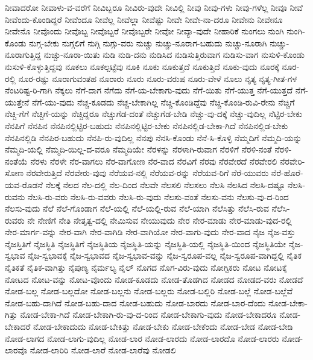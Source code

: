 {ನೀವಾದರೋ
ನೀವಾಳು-ವ-ವರೆಗೆ
ನೀವಿಬ್ಬರೂ
ನೀವಿರು-ವುದೇ
ನೀವಿಲ್ಲಿ
ನೀವು
ನೀವು-ಗಳು
ನೀವು-ಗಳೆಲ್ಲ
ನೀವೂ
ನೀವೆ
ನೀವೆಂದು-ಕೊಂಡಿದ್ದರೆ
ನೀವೆಂದೂ
ನೀವೆಲ್ಲ
ನೀವೆಲ್ಲಾ
ನೀವೆಷ್ಟು
ನೀವೇ
ನೀವೇ-ನಾ-ದರೂ
ನೀವೇನು
ನೀವೇನೂ
ನೀವೇನೊ
ನೀವೊಂದು
ನೀವೊಬ್ಬ
ನೀವೊಬ್ಬರೆ
ನೀವೊಬ್ಬರೇ
ನೀವೋ
ನೀವ್ಯಾ-ವುದೇ
ನೀಹಾರಿಕೆ
ನುಂಗಲು
ನುಂಗಿ
ನುಂಗಿ-ಕೊಂಡು
ನುಗ್ಗ-ಬೇಕು
ನುಗ್ಗಲಿಗೆ
ನುಗ್ಗಿ
ನುಗ್ಗು-ವರು
ನುಚ್ಚು
ನುಚ್ಚು-ನೂರಾಗ-ಬಹುದು
ನುಚ್ಚು-ನೂರಾಗಿ
ನುಚ್ಚು-ನೂರಾಗುತ್ತಿದ್ದ
ನುಚ್ಚು-ನೂರಾ-ಯಿತು
ನುಡಿ
ನುಡಿ-ದನು
ನುಡಿಸಿದ
ನುಡಿಸುತ್ತಿರುವಾಗ
ನುಡಿಸು-ವಾಗ
ನುಸುಳಿ-ಕೊಂಡು
ನುಸುಳಿ-ಕೊಳ್ಳುತ್ತಿದ್ದವು
ನೂಕಲು
ನೂಕಲ್ಪಟ್ಟೆವು
ನೂಕಿ
ನೂಕು
ನೂಕುತ್ತದೆ
ನೂಕುತ್ತಿದೆ
ನೂಕು-ವುದು
ನೂರಕ್ಕೆ
ನೂರ-ರಲ್ಲಿ
ನೂರ-ರಷ್ಟು
ನೂರಾಗುವಂತಹ
ನೂರಾರು
ನೂರು
ನೂರು-ವರುಷ
ನೂರು-ವೇಳೆ
ನೂಲು
ನೃತ್ಯ
ನೃತ್ಯ-ಗೀತ-ಗಳ
ನೆಂಟರಿಷ್ಟ-ರಿ-ಗಾಗಿ
ನೆಕ್ಕಲು
ನೆಗೆ-ದಾಗ
ನೆಗೆದು
ನೆಗೆ-ಯ-ಬೇಕಾಗು-ವುದು
ನೆಗೆ-ಯಿತು
ನೆಗೆ-ಯುತ್ತ
ನೆಗೆ-ಯುತ್ತದೆ
ನೆಗೆ-ಯುತ್ತೇನೆ
ನೆಗೆ-ಯು-ವುದು
ನೆಚ್ಚ-ಕೂಡದು
ನೆಚ್ಚ-ಬೇಕಾಗಿಲ್ಲ
ನೆಚ್ಚಿ-ಕೊಂಡಿದ್ದೆವು
ನೆಚ್ಚಿ-ಕೊಂಡಿ-ರುವಿ-ರೇನು
ನೆಚ್ಚಿಗೆ
ನೆಚ್ಚಿ-ಗೆಗೆ
ನೆಚ್ಚಿಗೆ-ಯನ್ನು
ನೆಚ್ಚಿದ್ದರೂ
ನೆಚ್ಚುಗೆಡ-ದಂತೆ
ನೆಚ್ಚುಗೆಡ-ಬೇಡಿ
ನೆಚ್ಚು-ವು-ದಕ್ಕೆ
ನೆಚ್ಚು-ವುದಿಲ್ಲ
ನೆಟ್ಟಿರ-ಬೇಕು
ನೆನಪಿಗೆ
ನೆನಪಿನ
ನೆನಪಿನಲ್ಲಿಟ್ಟಿರ-ಬಹುದು
ನೆನಪಿನಲ್ಲಿಟ್ಟಿರ-ಬೇಕು
ನೆನಪಿನಲ್ಲಿಡ-ಬೇಕಾ-ಗಿದೆ
ನೆನಪಿನಲ್ಲಿಡ-ಬೇಕು
ನೆನಪಿನಲ್ಲಿಡಿ
ನೆನಪಿರ-ಬಹುದು
ನೆನಪಿ-ರು-ವುದಿಲ್ಲ
ನೆನಪು
ನೆನಸಿ-ಕೊಂಡು
ನೆನೆ-ಸಿ-ಕೊಳ್ಳಿ
ನೆಮ್ಮದಿಗೆ
ನೆಮ್ಮದಿ-ಯನ್ನು
ನೆಮ್ಮದಿ-ಯಲ್ಲಿ
ನೆಮ್ಮದಿ-ಯಿಲ್ಲ-ದ-ವರೂ
ನೆಮ್ಮದಿಯೇ
ನೆರಳನ್ನು
ನೆರಳಾಗಿ-ರುವಾಗ
ನೆರಳಿಗೆ
ನೆರಳಿ-ನಂತೆ
ನೆರಳಿ-ನಂತೆಯೆ
ನೆರಳು
ನೆರಳೇ
ನೆರ-ವಾಗಲು
ನೆರ-ವಾಗೋಣ
ನೆರ-ವಾದ
ನೆರವಿಗೆ
ನೆರವು
ನೆರವೇರದೆ
ನೆರವೇರಲಿ
ನೆರವೇರಿ-ಸೋಣ
ನೆರವೇರುತ್ತಿದೆ
ನೆರವೇರು-ವುವು
ನೆರೆಯವ-ನಲ್ಲಿ
ನೆರೆಯವ-ರನ್ನು
ನೆರೆಯವ-ರಿಗೆ
ನೆರೆ-ಯುವರು
ನೆರೆ-ಹೊರೆ-ಯವ-ರೊಡನೆ
ನೆಲಕ್ಕೆ
ನೆಲದ
ನೆಲ-ದಲ್ಲಿ
ನೆಲ-ದಿಂದ
ನೆಲವೇ
ನೆಲಸಲಿ
ನೆಲಸಲು
ನೆಲಸಿ
ನೆಲಸಿದ
ನೆಲಸಿ-ದಷ್ಟೂ
ನೆಲಸಿ-ರುವನು
ನೆಲಸಿ-ರು-ವರು
ನೆಲಸಿ-ರು-ವವರು
ನೆಲಸಿ-ರು-ವುದು
ನೆಲಸು-ವಂತೆ
ನೆಲಸು-ವನು
ನೆಲಸು-ವು-ದ-ರಿಂದ
ನೆಲಸು-ವುದು
ನೆಲೆ
ನೆಲೆ-ಗೊಂಡಾಗ
ನೆಲೆ-ಯಲ್ಲಿ
ನೆಲೆ-ಯಲ್ಲಿ-ರುವ
ನೆಲೆ-ಯಾಗಿ
ನೆಲೆಸಿತ್ತು
ನೆಲೆಸಿ-ರುವ
ನೆಲೆಸಿ-ರುವರು
ನೇ
ನೇಣಿಗೆ
ನೇತಿ
ನೇತೃತ್ವ-ದಲ್ಲಿ
ನೇಮಿಸುವ
ನೇಯುವುದು
ನೇರ
ನೇರ-ಮಾಡು
ನೇರ-ಮಾಡು-ವುದ-ರಲ್ಲಿ
ನೇರ-ಮಾರ್ಗ-ವನ್ನು
ನೇರ-ವಾಗಿ
ನೇರ-ವಾಗಿಡಿ
ನೇರ-ವಾಗಿಯೋ
ನೇರ-ವಾಗು-ವುದು
ನೇರ-ವಾದ
ನೈಜ
ನೈಜ-ವಸ್ತು
ನೈಜಸ್ತಿತಿಗೆ
ನೈಜಸ್ಥಿತಿ
ನೈಜಸ್ಥಿತಿಗೆ
ನೈಜಸ್ಥಿತಿಯ
ನೈಜಸ್ಥಿತಿ-ಯನ್ನು
ನೈಜಸ್ಥಿತಿ-ಯಲ್ಲಿ
ನೈಜಸ್ಥಿತಿ-ಯಿಂದ
ನೈಜಸ್ಥಿತಿಯೇ
ನೈಜ-ಸ್ವಭಾವ
ನೈಜ-ಸ್ವಭಾವಕ್ಕೆ
ನೈಜ-ಸ್ವಭಾವದ
ನೈಜ-ಸ್ವಭಾವ-ವನ್ನು
ನೈಜ-ಸ್ವರೂಪ-ವಲ್ಲ
ನೈಜ-ಸ್ವರೂಪ-ವಾಗಿದ್ದಲ್ಲಿ
ನೈತಿಕ
ನೈತಿಕತೆ
ನೈತಿಕ-ವಾಗಿತ್ತು
ನೈಪುಣ್ಯ
ನೈರ್ಮಲ್ಯ
ನೈಲ್
ನೊಗದ
ನೊಗ-ವಿರು-ವುದು
ನೋಗ್ಟಿಕರು
ನೋಟ
ನೋಟಕ್ಕೆ
ನೋಟದ
ನೋಟ-ವನ್ನು
ನೋಟ-ವೊಂದು
ನೋಡ-ಕೂಡದು
ನೋಡ-ತೊಡಗಿದ
ನೋಡದ
ನೋಡದ-ವರು
ನೋಡದೆ
ನೋಡ-ಬಲ್ಲ
ನೋಡ-ಬಲ್ಲದೋ
ನೋಡ-ಬಲ್ಲನು
ನೋಡ-ಬಲ್ಲರು
ನೋಡ-ಬಲ್ಲಿರಿ
ನೋಡ-ಬಲ್ಲೆ
ನೋಡ-ಬಲ್ಲೆವೆ
ನೋಡ-ಬಹು-ದಾಗಿದೆ
ನೋಡ-ಬಹು-ದಾದ
ನೋಡ-ಬಹುದು
ನೋಡ-ಬಾರದು
ನೋಡ-ಬಾರ-ದೆಂದು
ನೋಡ-ಬೇಕಾ-ಗಿತ್ತು
ನೋಡ-ಬೇಕಾ-ಗಿದೆ
ನೋಡ-ಬೇಕಾಗಿ-ರು-ವು-ದ-ರಿಂದ
ನೋಡ-ಬೇಕಾಗು-ವುದು
ನೋಡ-ಬೇಕಾದರೂ
ನೋಡ-ಬೇಕಾದರೆ
ನೋಡ-ಬೇಕಾದುದು
ನೋಡ-ಬೇಕಿತ್ತು
ನೋಡ-ಬೇಕು
ನೋಡ-ಬೇಕೆಂದು
ನೋಡ-ಬೇಡ
ನೋಡ-ಬೇಡಿ
ನೋಡ-ಲಾಗದ
ನೋಡ-ಲಾಗು-ವುದಿಲ್ಲ
ನೋಡ-ಲಾರ
ನೋಡ-ಲಾರದು
ನೋಡ-ಲಾರದೊ
ನೋಡ-ಲಾರರು
ನೋಡ-ಲಾರವೊ
ನೋಡ-ಲಾರಿರಿ
ನೋಡ-ಲಾರೆ
ನೋಡ-ಲಾರೆವು
ನೋಡಲಿ
}
